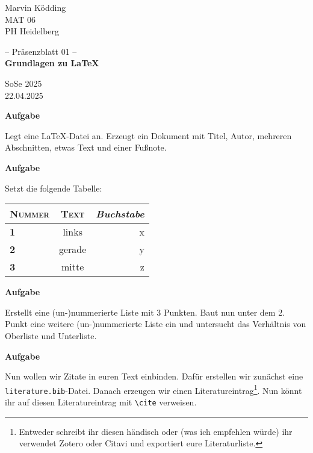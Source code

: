 \documentclass[a4paper, 12pt]{article}
\renewcommand{\date}{22.04.2025}
\newcommand{\klasse}{MAT 06}
\newcommand{\institute}{PH Heidelberg}
\newcommand{\topic}{Grundlagen zu \LaTeX}
\newcommand{\semester}{SoSe 2025}
\newcommand{\blatt}{01}
\newcounter{Aufgabe}
\newenvironment{aufgabe}{\addtocounter{Aufgabe}{1}%
	\textbf{Aufgabe \theAufgabe}
	
	\vspace*{-0.3em}}{\medskip}
\begin{document}
	\pagestyle{empty}
	\begin{minipage}{0.2\textwidth}
		Marvin Ködding\\\scriptsize \klasse\\\institute
	\end{minipage}
	\begin{minipage}{.6\textwidth}
		\centering
		-- Präsenzblatt \blatt{} --\\\textbf{\topic}
	\end{minipage}
	\begin{minipage}{.2\textwidth}
		\flushright \semester\\\scriptsize \date
	\end{minipage}
	
	\vspace*{1cm}
	
	\begin{aufgabe}
		Legt eine \LaTeX-Datei an. Erzeugt ein Dokument mit Titel, Autor, mehreren Abschnitten, etwas Text und einer Fußnote.
	\end{aufgabe}
	
	\begin{aufgabe}
		Setzt die folgende Tabelle:
		
		\begin{center}
			\begin{tabular}{|l||c|r|}
				\hline
				\textsc{Nummer} & \textsc{Text} & \textit{Buchstabe}\\
				\hline
				\textbf{1} & links & x\\
				\textbf{2} & gerade & y\\
				\textbf{3} & mitte & z\\
				\hline
			\end{tabular}
		\end{center}
	\end{aufgabe}
	
	\begin{aufgabe}
		Erstellt eine (un-)nummerierte Liste mit 3 Punkten. Baut nun unter dem 2. Punkt eine weitere (un-)nummerierte Liste ein und untersucht das Verhältnis von \glqq{}Oberliste\grqq{} und \glqq{}Unterliste\grqq{}.
	\end{aufgabe}
	
	\begin{aufgabe}
		Nun wollen wir Zitate in euren Text einbinden. Dafür erstellen wir zunächst eine \verb*|literature.bib|-Datei. Danach erzeugen wir einen Literatureintrag\footnote{Entweder schreibt ihr diesen händisch oder (was ich empfehlen würde) ihr verwendet Zotero oder Citavi und exportiert eure Literaturliste.}. Nun könnt ihr auf diesen Literatureintrag mit \verb*|\cite| verweisen.
	\end{aufgabe}
\end{document}
